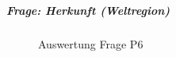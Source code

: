 \documentclass[../../main.tex]{subfiles}
\begin{document}
\subparagraph*{Frage: Herkunft (Weltregion)}\mbox{}
\begin{figure}[H]
\centering
{}
\caption{Auswertung Frage P6}
\label{P6}
\end{figure}
\end{document}

